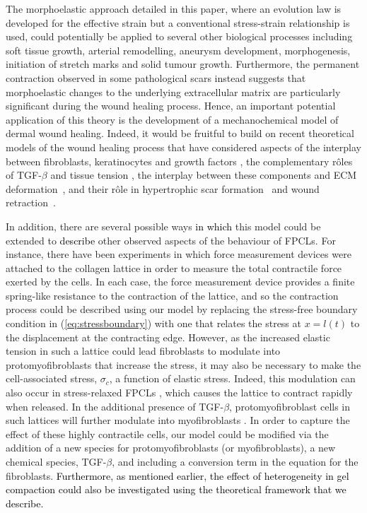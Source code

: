 The morphoelastic approach detailed in this paper, where an evolution law is developed for the effective strain but a conventional stress-strain relationship is used,  could potentially be applied to several other biological processes including soft tissue growth, arterial remodelling, aneurysm development, morphogenesis, initiation of stretch marks and solid tumour growth. Furthermore, the permanent contraction observed in some pathological scars instead suggests that morphoelastic changes to the underlying extracellular matrix are particularly significant during the wound healing process. Hence, an important potential application of this theory is the development of a mechanochemical model of dermal wound healing. Indeed, it would be fruitful to build on recent theoretical models of the wound healing process that have considered aspects of the interplay between fibroblasts, keratinocytes and growth factors \citep{Menon2012}, the complementary r\^{o}les of TGF-$\beta$ and tissue tension \citep{Murphy2011a,Murphy2012}, the interplay between these components and ECM deformation~\citep{Valero2014}, and their r\^{o}le in hypertrophic scar formation~\citep{Koppenol2017a} and wound retraction~\citep{Koppenol2017b}.

In addition, there are several possible ways \textcolor{black}{in which} this model could be extended to \textcolor{black}{describe} other observed aspects of the behaviour of FPCLs. For instance, there have been experiments in which force measurement devices were attached to the collagen lattice \citep{Kolodney1992,Brown1996,Marenzana2006} in order to measure the total contractile force exerted by the cells. In each case, the force measurement device provides a finite spring-like resistance to the contraction of the lattice, and so the contraction process could be described using our model by replacing the stress-free boundary condition in (\ref{eq:stressboundary}) with one that relates the stress at $x = l(t)$ to the displacement at the contracting edge. However, as the increased elastic tension in such a lattice could lead fibroblasts to modulate into protomyofibroblasts \citep{Tomasek2002} that increase the stress, it may also be necessary to make the cell-associated stress, $\sigma_c$, a function of elastic stress. Indeed, this modulation can also occur in stress-relaxed FPCLs \citep{Tomasek1992}, which causes the lattice to contract rapidly when released. In the additional presence of TGF-$\beta$, protomyofibroblast cells in such lattices will further modulate into myofibroblasts \citep{Desmouliere1993,Tomasek2002,Gabbiani2003,Desmouliere2005}. In order to capture the effect of these highly contractile cells, our model could be modified via the addition of a new species for protomyofibroblasts (or myofibroblasts), a new chemical species, TGF-$\beta$, and including a conversion term in the equation for the fibroblasts. \textcolor{black}{Furthermore, as mentioned earlier, the effect of heterogeneity in gel compaction could also be investigated using the theoretical framework that we describe.}

